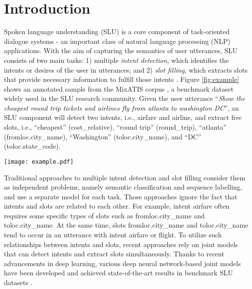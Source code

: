 \documentclass{ecai}
\begin{document}
\section{Introduction}
Spoken language understanding (SLU) is a core component of task-oriented dialogue systems - an important class of natural language processing (NLP) applications. With the aim of capturing the semantics of user utterances, SLU consists of two main tasks: 1) multiple \textit{intent detection}, which identifies the intents or desires of the user in utterances; and 2) \textit{slot filling}, which extracts slots that provide necessary information to fulfill those intents \cite{gangadharaiah-narayanaswamy:2019}. Figure \ref{fig:example} shows an annotated sample from the MixATIS corpus \cite{qin:2020}, a benchmark dataset widely used in the SLU research community. Given the user utterance ``\textit{Show the cheapest round trip tickets and airlines fly from atlanta to washington DC}'', an SLU component will detect two intents, i.e., airfare and  airline, and extract five slots, i.e., ``cheapest'' (cost\_relative), ``round trip'' (round\_trip), ``atlanta'' (fromloc.city\_name), ``Washington'' (toloc.city\_name), and ``DC'' (toloc.state\_code).  
\begin{figure*}[t]
	\begin{center}
		\texttt{[image: example.pdf]}
	\end{center}	
            \vspace{-10pt}
		\caption{An example from the MixATIS dataset.}
	\label{fig:example}
\end{figure*}

Traditional approaches to multiple intent detection and slot filling consider them as independent problems, namely semantic classification and sequence labelling, and use a separate model for each task. Those approaches ignore the fact that intents and slots are related to each other. For example, intent airfare often requires some specific types of slots such as fromloc.city\_name and toloc.city\_name. At the same time, slots fromloc.city\_name and toloc.city\_name tend to occur in an utterance with intent airfare or flight. To utilize such relationships between intents and slots, recent approaches rely on joint models that can detect intents and extract slots simultaneously. Thanks to recent advancements in deep learning, various deep neural network-based joint models have been developed and achieved state-of-the-art results in benchmark SLU datasets \cite{cai:2022,chen-coling:2022,ding:2021,song:2022}. 
\end{document}
